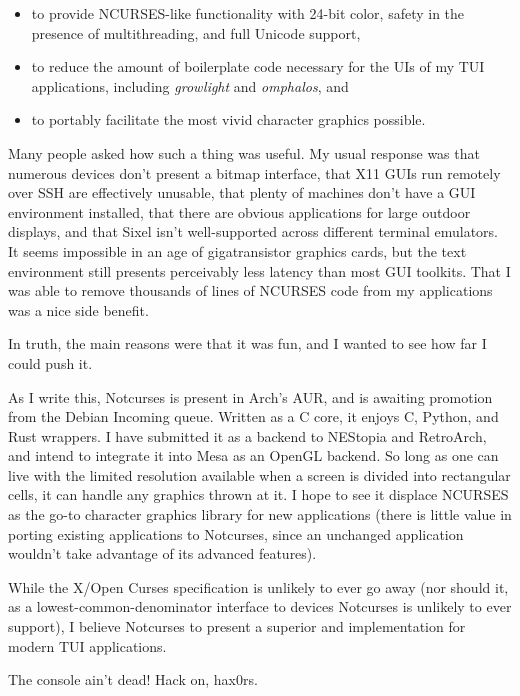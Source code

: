 \documentclass[letterpaper,10pt]{article}
\newenvironment{denseitemize}{
  \begin{itemize}
      \setlength{\itemsep}{0pt}
}{
  \end{itemize}
}
\newcommand\CC{C\nolinebreak\hspace{-.05em}\raisebox{.4ex}{\relsize{-3}{\textbf{+}}}\nolinebreak\hspace{-.10em}\raisebox{.4ex}{\relsize{-3}{\textbf{+}}}\hspace{.2em}}
\begin{document}
\begin{denseitemize}
\item to provide NCURSES-like functionality with 24-bit color, safety in the
    presence of multithreading, and full Unicode support,
\item to reduce the amount of boilerplate code necessary for the UIs of my
    TUI applications, including \textit{growlight} and \textit{omphalos}, and
\item to portably facilitate the most vivid character graphics possible.
\end{denseitemize}

Many people asked how such a thing was useful. My usual response was that
numerous devices don't present a bitmap interface, that X11 GUIs run remotely
over SSH are effectively unusable, that plenty of machines don't have a GUI
environment installed, that there are obvious applications for large outdoor
displays, and that Sixel isn't well-supported across different
terminal emulators. It seems impossible in an age of gigatransistor graphics
cards, but the text environment still presents perceivably less latency
than most GUI toolkits. That I was able to remove thousands of lines
of NCURSES code from my applications was a nice side benefit.

In truth, the main reasons were that it was fun, and I wanted to see how far
I could push it.

As I write this, Notcurses is present in Arch's AUR, and is awaiting promotion
from the Debian Incoming queue. Written as a C core, it enjoys \CC, Python, and
Rust wrappers. I have submitted it as a backend to NEStopia and RetroArch, and
intend to integrate it into Mesa as an OpenGL backend. So long as one can live
with the limited resolution available when a screen is divided into rectangular
cells, it can handle any graphics thrown at it. I hope to see it displace
NCURSES as the go-to character graphics library for new applications (there is
little value in porting existing applications to Notcurses, since an unchanged
application wouldn't take advantage of its advanced features).

While the X/Open Curses specification is unlikely to ever go away (nor should
it, as a lowest-common-denominator interface to devices Notcurses is unlikely
to ever support), I believe Notcurses to present a superior and
implementation for modern TUI applications.

The console ain't dead! Hack on, hax0rs.

\vfill
\end{document}
